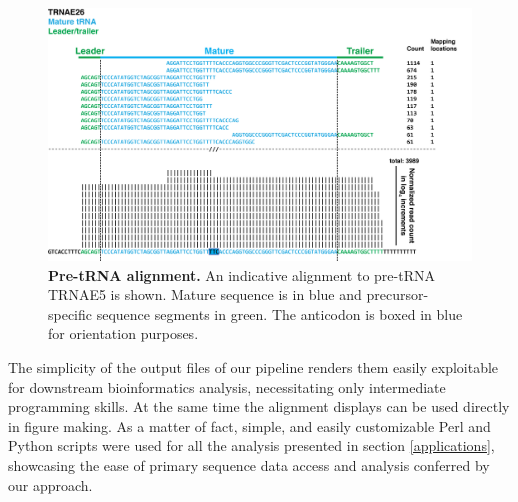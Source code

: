 \documentclass[12pt]{rockefeller}
\begin{document}
\begin{figure}[!ht]%
\centering
\includegraphics[width=5in]{pre.png}%
\caption[Pre-tRNA alignment]{\textbf{Pre-tRNA alignment.} An indicative alignment to pre-tRNA TRNAE5 is shown. Mature sequence is in blue and precursor-specific sequence segments in green. The anticodon is boxed in blue for orientation purposes.}
\centering
\label{pre}%
\end{figure}

The simplicity of the output files of our pipeline renders them easily exploitable for downstream bioinformatics analysis, necessitating only intermediate programming skills. At the same time the alignment displays can be used directly in figure making. As a matter of fact, simple, and easily customizable Perl and Python scripts were used for all the analysis presented in section \ref{applications}, showcasing the ease of primary sequence data access and analysis conferred by our approach.
\end{document}
